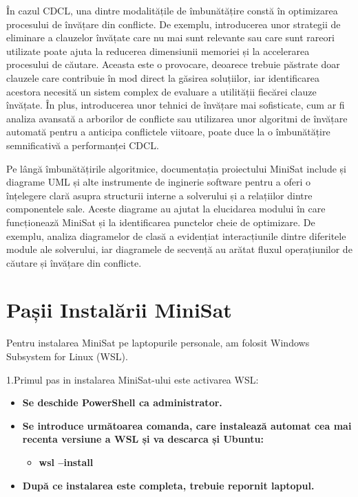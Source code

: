 \documentclass[12pt,a4paper]{report}
\begin{document}
În cazul CDCL, una dintre modalitățile de îmbunătățire constă în optimizarea procesului de învățare din conflicte. De exemplu, introducerea unor strategii de eliminare a clauzelor învățate care nu mai sunt relevante sau care sunt rareori utilizate poate ajuta la reducerea dimensiunii memoriei și la accelerarea procesului de căutare. Aceasta este o provocare, deoarece trebuie păstrate doar clauzele care contribuie în mod direct la găsirea soluțiilor, iar identificarea acestora necesită un sistem complex de evaluare a utilității fiecărei clauze învățate. În plus, introducerea unor tehnici de învățare mai sofisticate, cum ar fi analiza avansată a arborilor de conflicte sau utilizarea unor algoritmi de învățare automată pentru a anticipa conflictele viitoare, poate duce la o îmbunătățire semnificativă a performanței CDCL.

Pe lângă îmbunătățirile algoritmice, documentația proiectului MiniSat include și diagrame UML și alte instrumente de inginerie software pentru a oferi o înțelegere clară asupra structurii interne a solverului și a relațiilor dintre componentele sale. Aceste diagrame au ajutat la elucidarea modului în care funcționează MiniSat și la identificarea punctelor cheie de optimizare. De exemplu, analiza diagramelor de clasă a evidențiat interacțiunile dintre diferitele module ale solverului, iar diagramele de secvență au arătat fluxul operațiunilor de căutare și învățare din conflicte.

\newpage

\chapter{Pașii Instalării MiniSat}
Pentru instalarea MiniSat pe laptopurile personale, am folosit Windows Subsystem for Linux (WSL). 

1.Primul pas in instalarea MiniSat-ului este activarea WSL:
\vspace{5pt}

 \begin{itemize}
 \item \textbf{Se deschide PowerShell ca administrator.} 

 \item \textbf{Se introduce următoarea comanda, care instalează automat cea mai recenta versiune a WSL și va descarca și Ubuntu:} 
 \vspace{5pt}
 \begin{itemize}
     \item \textbf{wsl --install}
 \end{itemize}

\item \textbf{După ce instalarea este completa, trebuie repornit laptopul.} 

\end{itemize}
 
\end{document}
